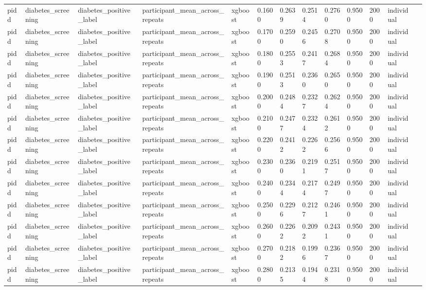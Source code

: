\begin{tabular}{lllllllllllll}
pidd & diabetes\_screening & diabetes\_positive\_label & participant\_mean\_across\_repeats & xgboost & 0.1600 & 0.2639 & 0.2514 & 0.2760 & 0.9500 & 2000 & individual &  \\
pidd & diabetes\_screening & diabetes\_positive\_label & participant\_mean\_across\_repeats & xgboost & 0.1700 & 0.2590 & 0.2456 & 0.2708 & 0.9500 & 2000 & individual &  \\
pidd & diabetes\_screening & diabetes\_positive\_label & participant\_mean\_across\_repeats & xgboost & 0.1800 & 0.2553 & 0.2417 & 0.2684 & 0.9500 & 2000 & individual &  \\
pidd & diabetes\_screening & diabetes\_positive\_label & participant\_mean\_across\_repeats & xgboost & 0.1900 & 0.2513 & 0.2360 & 0.2650 & 0.9500 & 2000 & individual &  \\
pidd & diabetes\_screening & diabetes\_positive\_label & participant\_mean\_across\_repeats & xgboost & 0.2000 & 0.2484 & 0.2327 & 0.2624 & 0.9500 & 2000 & individual &  \\
pidd & diabetes\_screening & diabetes\_positive\_label & participant\_mean\_across\_repeats & xgboost & 0.2100 & 0.2477 & 0.2324 & 0.2612 & 0.9500 & 2000 & individual &  \\
pidd & diabetes\_screening & diabetes\_positive\_label & participant\_mean\_across\_repeats & xgboost & 0.2200 & 0.2412 & 0.2262 & 0.2566 & 0.9500 & 2000 & individual &  \\
pidd & diabetes\_screening & diabetes\_positive\_label & participant\_mean\_across\_repeats & xgboost & 0.2300 & 0.2360 & 0.2191 & 0.2517 & 0.9500 & 2000 & individual &  \\
pidd & diabetes\_screening & diabetes\_positive\_label & participant\_mean\_across\_repeats & xgboost & 0.2400 & 0.2344 & 0.2174 & 0.2497 & 0.9500 & 2000 & individual &  \\
pidd & diabetes\_screening & diabetes\_positive\_label & participant\_mean\_across\_repeats & xgboost & 0.2500 & 0.2296 & 0.2127 & 0.2461 & 0.9500 & 2000 & individual &  \\
pidd & diabetes\_screening & diabetes\_positive\_label & participant\_mean\_across\_repeats & xgboost & 0.2600 & 0.2262 & 0.2092 & 0.2431 & 0.9500 & 2000 & individual &  \\
pidd & diabetes\_screening & diabetes\_positive\_label & participant\_mean\_across\_repeats & xgboost & 0.2700 & 0.2182 & 0.1996 & 0.2367 & 0.9500 & 2000 & individual &  \\
pidd & diabetes\_screening & diabetes\_positive\_label & participant\_mean\_across\_repeats & xgboost & 0.2800 & 0.2135 & 0.1944 & 0.2318 & 0.9500 & 2000 & individual &  \\

\end{tabular}
